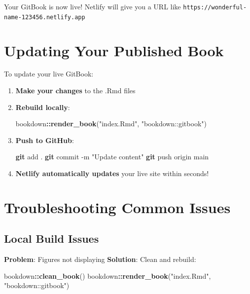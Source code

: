 \documentclass[
]{book}
\newenvironment{Shaded}{\begin{snugshade}}{\end{snugshade}}
\newcommand{\AttributeTok}[1]{\textcolor[rgb]{0.13,0.29,0.53}{#1}}
\newcommand{\FunctionTok}[1]{\textcolor[rgb]{0.13,0.29,0.53}{\textbf{#1}}}
\newcommand{\NormalTok}[1]{#1}
\newcommand{\SpecialCharTok}[1]{\textcolor[rgb]{0.81,0.36,0.00}{\textbf{#1}}}
\newcommand{\StringTok}[1]{\textcolor[rgb]{0.31,0.60,0.02}{#1}}
\begin{document}
Your GitBook is now live! Netlify will give you a URL like \texttt{https://wonderful-name-123456.netlify.app}

\section{Updating Your Published Book}\label{updating-your-published-book}

To update your live GitBook:

\begin{enumerate}
\def\labelenumi{\arabic{enumi}.}
\item
  \textbf{Make your changes} to the .Rmd files
\item
  \textbf{Rebuild locally}:

\begin{Shaded}
\begin{Highlighting}[]
\NormalTok{bookdown}\SpecialCharTok{::}\FunctionTok{render\_book}\NormalTok{(}\StringTok{"index.Rmd"}\NormalTok{, }\StringTok{"bookdown::gitbook"}\NormalTok{)}
\end{Highlighting}
\end{Shaded}
\item
  \textbf{Push to GitHub}:

\begin{Shaded}
\begin{Highlighting}[]
\FunctionTok{git}\NormalTok{ add .}
\FunctionTok{git}\NormalTok{ commit }\AttributeTok{{-}m} \StringTok{"Update content"}
\FunctionTok{git}\NormalTok{ push origin main}
\end{Highlighting}
\end{Shaded}
\item
  \textbf{Netlify automatically updates} your live site within seconds!
\end{enumerate}

\section{Troubleshooting Common Issues}\label{troubleshooting-common-issues}

\subsection{Local Build Issues}\label{local-build-issues}

\textbf{Problem}: Figures not displaying
\textbf{Solution}: Clean and rebuild:

\begin{Shaded}
\begin{Highlighting}[]
\NormalTok{bookdown}\SpecialCharTok{::}\FunctionTok{clean\_book}\NormalTok{()}
\NormalTok{bookdown}\SpecialCharTok{::}\FunctionTok{render\_book}\NormalTok{(}\StringTok{"index.Rmd"}\NormalTok{, }\StringTok{"bookdown::gitbook"}\NormalTok{)}
\end{Highlighting}
\end{Shaded}
\end{document}
